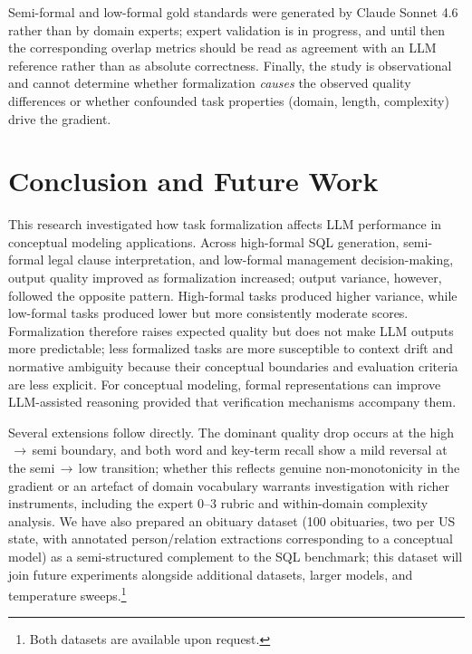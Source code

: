\documentclass[runningheads]{llncs}
\begin{document}
Semi-formal and low-formal gold standards were generated by Claude Sonnet 4.6 rather than by domain experts; expert validation is in progress, and until then the corresponding overlap metrics should be read as agreement with an LLM reference rather than as absolute correctness. Finally, the study is observational and cannot determine whether formalization \emph{causes} the observed quality differences or whether confounded task properties (domain, length, complexity) drive the gradient.

\section{Conclusion and Future Work}
\label{sec:conclusion}

This research investigated how task formalization affects LLM performance in conceptual modeling applications. Across high-formal SQL generation, semi-formal legal clause interpretation, and low-formal management decision-making, output quality improved as formalization increased; output variance, however, followed the opposite pattern. High-formal tasks produced higher variance, while low-formal tasks produced lower but more consistently moderate scores. Formalization therefore raises expected quality but does not make LLM outputs more predictable; less formalized tasks are more susceptible to context drift and normative ambiguity because their conceptual boundaries and evaluation criteria are less explicit. For conceptual modeling, formal representations can improve LLM-assisted reasoning provided that verification mechanisms accompany them.

Several extensions follow directly. The dominant quality drop occurs at the high$\,\to\,$semi boundary, and both word and key-term recall show a mild reversal at the semi$\,\to\,$low transition; whether this reflects genuine non-monotonicity in the gradient or an artefact of domain vocabulary warrants investigation with richer instruments, including the expert $0$--$3$ rubric and within-domain complexity analysis. We have also prepared an obituary dataset (100 obituaries, two per US state, with annotated person/relation extractions corresponding to a conceptual model) as a semi-structured complement to the SQL benchmark; this dataset will join future experiments alongside additional datasets, larger models, and temperature sweeps.\footnote{Both datasets are available upon request.}



\end{document}
